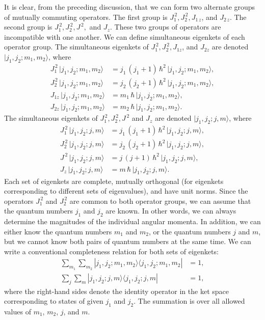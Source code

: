 It is clear, from the preceding discussion, that we can form two alternate groups
of mutually commuting operators. The first group
is $J_1^{\,2}, J_2^{\,2}, J_{1\,z}$, and
$J_{2\,z}$. The second group is $J_1^{\,2}, J_2^{\,2}, J^{\,2},$ and $J_z$. These two
groups of operators are incompatible with one another.  We can define simultaneous 
eigenkets of each operator group. The simultaneous eigenkets of
$J_1^{\,2}, J_2^{\,2}, J_{1z}$, and
$J_{2z}$ are denoted $|j_1,j_2; m_1,m_2\rangle$, where
\begin{align}
J_1^{\,2}\, |j_1,j_2; m_1,m_2\rangle &= j_1\,(j_1+1)\,\hbar^2\,|j_1,j_2; m_1,m_2\rangle,
\\[0.5ex]
J_2^{\,2} \,|j_1,j_2; m_1,m_2\rangle &= j_2\,(j_2+1)\,\hbar^2\,|j_1,j_2; m_1,m_2\rangle,
\\[0.5ex]
J_{1z}\, |j_1,j_2; m_1,m_2\rangle &= m_1\,\hbar\,|j_1,j_2; m_1,m_2\rangle,
\\[0.5ex]
J_{2z}\, |j_1,j_2; m_1,m_2\rangle &= m_2\,\hbar\,|j_1,j_2; m_1,m_2\rangle.
\end{align}
The simultaneous eigenkets of
$J_1^{\,2}, J_2^{\,2}, J^{\,2}$ and $J_z$ are denoted 
$|j_1, j_2; j, m\rangle$, where 
\begin{align}
J_1^{\,2}\, |j_1,j_2; j,m\rangle &= j_1\,(j_1+1)\,\hbar^2\,|j_1,j_2; j,m\rangle,
\\[0.5ex]
J_2^{\,2} \,|j_1,j_2; j,m\rangle &= j_2\,(j_2+1)\,\hbar^2\,|j_1,j_2; j,m\rangle,
\\[0.5ex]
J^{\,2} \,|j_1,j_2; j,m\rangle &=j\,(j+1)\,\hbar^2\,|j_1,j_2; j,m\rangle,
\\[0.5ex]
J_{z}\, |j_1,j_2; j,m\rangle &= m\,\hbar\,|j_1,j_2; j,m\rangle.
\end{align}
Each set of eigenkets are complete, mutually orthogonal (for eigenkets corresponding
to different sets of eigenvalues), and have unit norms. Since the operators
$J_1^{\,2}$ and $J_2^{\,2}$ are common to both  operator groups, we can  assume
that the quantum numbers $j_1$ and $j_2$ are known. In other words, we 
can always determine
 the magnitudes of the individual angular momenta. In addition, we can either
know the quantum numbers $m_1$ and $m_2$, or the quantum numbers $j$ and
$m$, but we cannot know both pairs of quantum numbers at the same time. 
We can write a conventional completeness relation for both sets of
eigenkets:
\begin{align}\label{e5.212a}
\sum_{m_1}\sum_{m_2 }|j_1,j_2; m_1, m_2\rangle \langle j_1,j_2; m_1, m_2|& =1,\\[0.5ex]
\sum_{j}\sum_{m} |j_1,j_2; j, m\rangle \langle j_1,j_2; j, m|& =1,
\end{align}
where the right-hand sides denote  the identity operator in the ket space corresponding
to states of given $j_1$ and $j_2$. The summation is over all allowed values
of $m_1$, $m_2$, $j$, and $m$.

